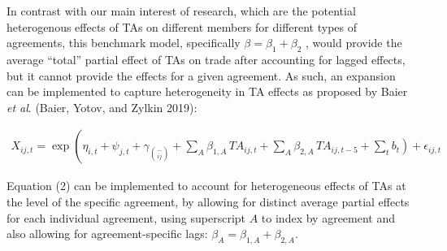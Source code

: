 In contrast with our main interest of research, which are the potential
heterogenous effects of TAs on different members for different types of
agreements, this benchmark model, specifically
\(\beta = \beta_{1} + \beta_{2}\) , would provide the average ``total''
partial effect of TAs on trade after accounting for lagged effects, but
it cannot provide the effects for a given agreement. As such, an
expansion can be implemented to capture heterogeneity in TA effects as
proposed by Baier \emph{et al}. (Baier, Yotov, and Zylkin 2019):

\begin{multline}
    X_{ij,t} = \exp\left(\eta_{i,t} + \psi_{j,t} + \gamma_{\binom{-}{ij}} + \sum_{A} \beta_{1,A} \, TA_{ij,t} \right. + \sum_{A} \beta_{2,A} \, TA_{ij,t-5} + \left. \sum_{t} b_{t} \right) + \epsilon_{ij,t}
\end{multline}

Equation (2) can be implemented to account for heterogeneous effects of
TAs at the level of the specific agreement, by allowing for distinct
average partial effects for each individual agreement, using superscript
\(A\) to index by agreement and also allowing for agreement-specific
lags: \(\beta_{A} = \beta_{1,A} + \beta_{2,A}\).
